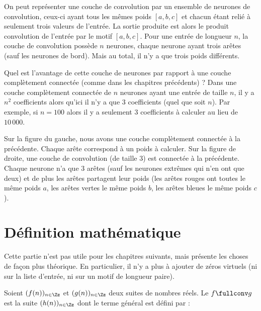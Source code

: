 \documentclass[11pt,class=report,crop=false]{standalone}
\begin{document}
On peut représenter une couche de convolution par un ensemble de neurones de convolution, 
ceux-ci ayant tous les mêmes poids $[a,b,c]$ et chacun étant relié à seulement trois valeurs de l'entrée. La sortie produite est alors le produit  convolution de l'entrée par le motif $[a,b,c]$.
Pour une entrée de longueur $n$, la couche de convolution possède $n$ neurones, chaque neurone ayant trois arêtes (sauf les neurones de bord). Mais au total, il n'y a que trois poids différents.



Quel est l'avantage de cette couche de neurones par rapport à une couche complètement connectée (comme dans les chapitres précédents) ?
Dans une couche complètement connectée de $n$ neurones ayant une entrée de taille $n$, il y a $n^2$ coefficients alors qu'ici il n'y a que $3$ coefficients (quel que soit $n$). Par exemple, si $n=100$ alors il y a seulement $3$ coefficients à calculer au lieu de $10\,000$.


Sur la figure du gauche, nous avons une couche complètement connectée à la précédente. Chaque arête correspond à un poids à calculer. Sur la figure de droite, une couche de convolution (de taille $3$) est connectée à la précédente.
Chaque neurone n'a que $3$ arêtes (sauf les neurones extrêmes qui n'en ont que deux) et de plus les arêtes partagent leur poids (les arêtes rouges ont toutes le même poids $a$, les arêtes vertes le même poids $b$, les arêtes bleues le même poids $c$).


\section{Définition mathématique}

Cette partie  n'est pas utile pour les chapitres suivants, mais présente les choses de façon plus théorique.
En particulier, il n'y a plus à ajouter de zéros virtuels (ni sur la liste d'entrée, ni sur un motif de longueur paire). 


\begin{definition}
Soient $(f(n))_{n\in\Zz}$ et $(g(n))_{n\in\Zz}$ deux suites de nombres réels.
Le  $f \fullconv g$ est la suite $(h(n))_{n\in\Zz}$ dont le terme général est défini par :
\end{definition}
\end{document}
